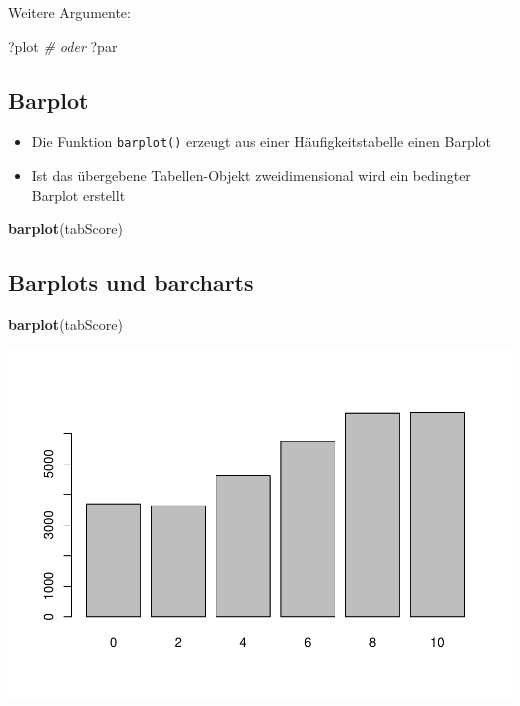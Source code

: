 \documentclass[]{article}
\newenvironment{Shaded}{\begin{snugshade}}{\end{snugshade}}
\newcommand{\KeywordTok}[1]{\textcolor[rgb]{0.13,0.29,0.53}{\textbf{{#1}}}}
\newcommand{\StringTok}[1]{\textcolor[rgb]{0.31,0.60,0.02}{{#1}}}
\newcommand{\CommentTok}[1]{\textcolor[rgb]{0.56,0.35,0.01}{\textit{{#1}}}}
\newcommand{\NormalTok}[1]{{#1}}
\providecommand{\tightlist}{%
  \setlength{\itemsep}{0pt}\setlength{\parskip}{0pt}}
\begin{document}
Weitere Argumente:

\begin{Shaded}
\begin{Highlighting}[]
\NormalTok{?plot}
\CommentTok{# oder}
\NormalTok{?par}
\end{Highlighting}
\end{Shaded}

\subsection{Barplot}\label{barplot}

\begin{itemize}
\tightlist
\item
  Die Funktion \texttt{barplot()} erzeugt aus einer Häufigkeitstabelle
  einen Barplot
\item
  Ist das übergebene Tabellen-Objekt zweidimensional wird ein bedingter
  Barplot erstellt
\end{itemize}

\begin{Shaded}
\end{Shaded}

\begin{Shaded}
\begin{Highlighting}[]
\KeywordTok{barplot}\NormalTok{(tabScore)}
\end{Highlighting}
\end{Shaded}

\subsection{Barplots und barcharts}\label{barplots-und-barcharts}

\begin{Shaded}
\begin{Highlighting}[]
\KeywordTok{barplot}\NormalTok{(tabScore)}
\end{Highlighting}
\end{Shaded}

\includegraphics{Intro_Datenanalyse1_files/figure-latex/unnamed-chunk-146-1.pdf}
\end{document}
